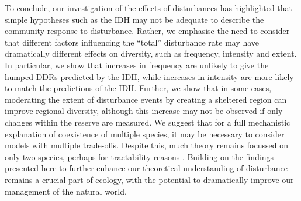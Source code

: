 To conclude, our investigation of the effects of disturbances has highlighted that simple hypotheses such as the IDH may not be adequate to describe the community response  to disturbance. Rather, we emphasise the need to consider that different factors influencing the ``total'' disturbance rate may have dramatically different effects on diversity, such as frequency, intensity and extent. In particular, we show that increases in frequency are unlikely to give the humped DDRs predicted by the IDH, while increases in intensity are more likely to match the predictions of the IDH. Further, we show that in some cases, moderating the extent of disturbance events by creating a sheltered region can improve regional diversity, although this increase may not be observed if only changes within the reserve are measured. We suggest that for a full mechanistic explanation of coexistence of multiple species, it may be necessary to consider models with multiple trade-offs. Despite this, much theory remains focussed on only two species, perhaps for tractability reasons \citep[e.g.][]{miller2011frequency,chesson2008interaction}. Building on the findings presented here to further enhance our theoretical understanding of disturbance remains a crucial part of ecology, with the potential to dramatically improve our management of the natural world.

